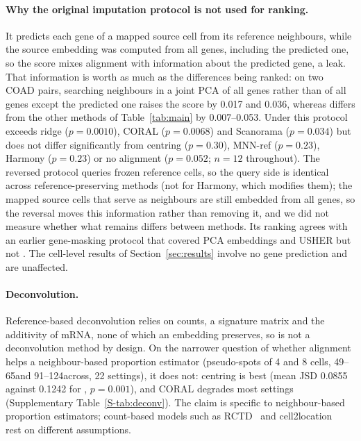 \paragraph{Why the original imputation protocol is not used for ranking.}
It predicts each gene of a mapped source cell from its reference neighbours, while the source embedding was computed
from all genes, including the predicted one, so the score mixes alignment with information about the predicted gene, a leak.
That information is worth as much as the differences being ranked: on two COAD pairs, searching neighbours in a joint
PCA of all genes rather than of all genes except the predicted one raises the score by 0.017 and 0.036, whereas
\frost differs from the other methods of Table~\ref{tab:main} by 0.007--0.053. Under this protocol \frost exceeds
ridge ($p=0.0010$), CORAL ($p=0.0068$) and Scanorama ($p=0.034$) but does not differ significantly from centring
($p=0.30$), MNN-ref ($p=0.23$), Harmony ($p=0.23$) or no alignment ($p=0.052$; $n=12$ throughout). The reversed
protocol queries frozen reference cells, so the query side is identical across reference-preserving methods (not
for Harmony, which modifies them); the mapped source cells that serve as neighbours are still embedded from all
genes, so the reversal moves this information rather than removing it, and we did not measure whether what remains
differs between methods. Its ranking agrees with an earlier gene-masking protocol that covered PCA embeddings and
USHER but not \frost. The cell-level results of Section~\ref{sec:results} involve no gene prediction and are
unaffected.

\paragraph{Deconvolution.}
Reference-based deconvolution relies on counts, a signature matrix and the additivity of mRNA, none of which an
embedding preserves, so \frost is not a deconvolution method by design. On the narrower question of whether alignment
helps a neighbour-based proportion estimator (pseudo-spots of 4 and 8 cells, 49--65\um and 91--124\um across, 22
settings), it does not: centring is best (mean JSD 0.0855 against 0.1242 for \frost, $p=0.001$), and CORAL degrades
most settings (Supplementary Table~\ref{S-tab:deconv}). The claim is specific to neighbour-based proportion
estimators; count-based models such as RCTD~\citep{cable2022rctd} and
cell2location~\citep{kleshchevnikov2022cell2location} rest on different assumptions.

